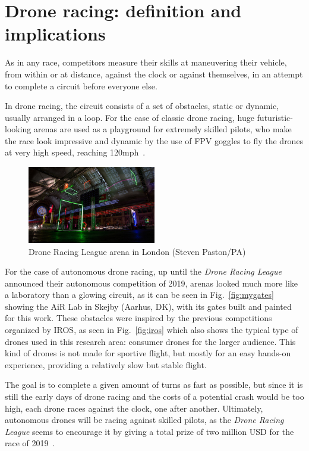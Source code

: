 \section{Drone racing: definition and implications}

As in any race, competitors measure their skills at maneuvering their vehicle,
from within or at distance, against the clock or against themselves, in an
attempt to complete a circuit before everyone else.

In drone racing, the circuit consists of a set of obstacles, static or
dynamic, usually arranged in a loop. For the case of classic drone racing, huge
futuristic-looking arenas are used as a playground for extremely skilled pilots,
who make the race look impressive and dynamic by the use of FPV goggles to fly
the drones at very high speed, reaching 120mph~\cite{DRL}.

\begin{figure}[h]
	\centering
	\includegraphics[width=0.5\textwidth]{figure/drl_arena.jpg}
	\caption{Drone Racing League arena in London (Steven
	Paston/PA)~\cite{DRLRecord}}
\end{figure}

For the case of autonomous drone racing, up until the \emph{Drone Racing
League} announced their autonomous competition of 2019, arenas looked much more
like a laboratory than a glowing circuit, as it can be seen in
Fig.~\ref{fig:mygates} showing the AiR Lab in Skejby (Aarhus, DK), with its
gates built and painted for this work. These obstacles were inspired by the
previous competitions organized by IROS, as seen in Fig.~\ref{fig:iros} which
also shows the typical type of drones used in this research area: consumer
drones for the larger audience. This kind of drones is not made for sportive
flight, but mostly for an easy hands-on experience, providing a relatively slow
but stable flight.

The goal is to complete a given amount of turns as fast as possible, but since
it is still the early days of drone racing and the costs of a potential crash
would be too high, each drone races against the clock, one after another.
Ultimately, autonomous drones will be racing against skilled pilots, as the
\emph{Drone Racing League} seems to encourage it by giving a total prize of two
million USD for the race of 2019~\cite{LockheedDRL}.


